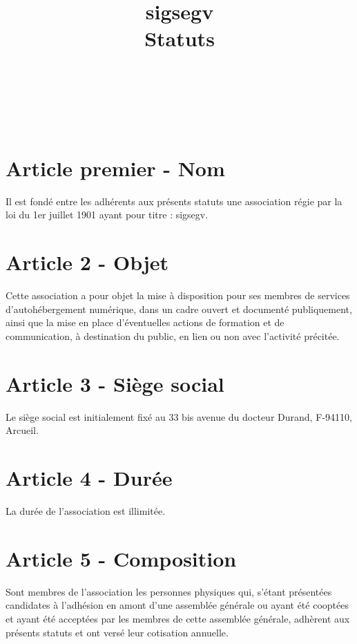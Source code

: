 \documentclass[a4paper,oneside,10pt]{article}
\begin{document}
\date{}
\title{sigsegv \\{\huge Statuts}}

{ \\
}

{\\
}

\section*{Article premier - Nom}

Il est fondé entre les adhérents aux présents statuts une association régie par la loi du 1er juillet 1901 ayant pour titre : sigsegv.

\section*{Article 2 - Objet}

Cette association a pour objet la mise à disposition pour ses membres de services d’autohébergement numérique, dans un cadre ouvert et documenté publiquement, ainsi que la mise en place d’éventuelles actions de formation et de communication, à destination du public, en lien ou non avec l'activité précitée.

\section*{Article 3 - Siège social}

Le siège social est initialement fixé au 33 bis avenue du docteur Durand, F-94110, Arcueil.

\section*{Article 4 - Durée}

La durée de l'association est illimitée.

\section*{Article 5 - Composition}

Sont membres de l’association les personnes physiques qui, s'étant présentées candidates à l'adhésion en amont d'une assemblée générale ou ayant été cooptées et ayant été acceptées par les membres de cette assemblée générale, adhèrent aux présents statuts et ont versé leur cotisation annuelle.
\end{document}
